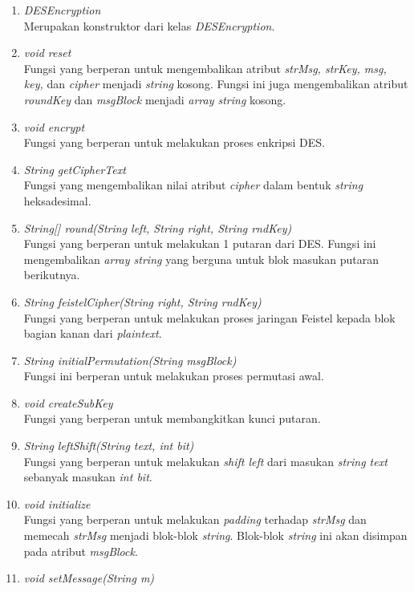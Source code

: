 \begin{enumerate}
	\item \textit{DESEncryption} \\
	Merupakan konstruktor dari kelas \textit{DESEncryption}.
	\item \textit{void reset} \\
	Fungsi yang berperan untuk mengembalikan atribut \textit{strMsg, strKey, msg, key,} dan \textit{cipher} menjadi \textit{string} kosong. Fungsi ini juga mengembalikan atribut \textit{roundKey} dan \textit{msgBlock} menjadi \textit{array string} kosong.
	\item \textit{void encrypt} \\
	Fungsi yang berperan untuk melakukan proses enkripsi DES.
	\item \textit{String getCipherText} \\
	Fungsi yang mengembalikan nilai atribut \textit{cipher} dalam bentuk \textit{string} heksadesimal.
	\item \textit{String[] round(String left, String right, String rndKey)} \\
	Fungsi yang berperan untuk melakukan 1 putaran dari DES. Fungsi ini mengembalikan \textit{array string} yang berguna untuk blok masukan putaran berikutnya.
	\item \textit{String feistelCipher(String right, String rndKey)} \\
	Fungsi yang berperan untuk melakukan proses jaringan Feistel kepada blok bagian kanan dari \textit{plaintext}.
	\item \textit{String initialPermutation(String msgBlock)} \\
	Fungsi ini berperan untuk melakukan proses permutasi awal.
	\item \textit{void createSubKey} \\
	Fungsi yang berperan untuk membangkitkan kunci putaran.
	\item \textit{String leftShift(String text, int bit)} \\
	Fungsi yang berperan untuk melakukan \textit{shift left} dari masukan \textit{string text} sebanyak masukan \textit{int bit}.
	\item \textit{void initialize} \\
	Fungsi yang berperan untuk melakukan \textit{padding} terhadap \textit{strMsg} dan memecah \textit{strMsg} menjadi blok-blok \textit{string}. Blok-blok \textit{string} ini akan disimpan pada atribut \textit{msgBlock}.
	\item \textit{void setMessage(String m)} \\

\end{enumerate}
